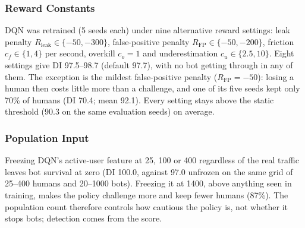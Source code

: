 \documentclass{ieeetj}
\begin{document}
\vspace{-15pt}
\subsubsection{Reward Constants}
DQN was retrained (5 seeds each) under nine alternative reward settings: leak penalty $R_{\text{leak}}\in\{-50,-300\}$, false-positive penalty $R_{\text{FP}}\in\{-50,-200\}$, friction $c_f\in\{1,4\}$ per second, overkill $c_o=1$ and underestimation $c_u\in\{2.5,10\}$. Eight settings give DI 97.5--98.7 (default 97.7), with no bot getting through in any of them. The exception is the mildest false-positive penalty ($R_{\text{FP}}=-50$): losing a human then costs little more than a challenge, and one of its five seeds kept only 70\% of humans (DI 70.4; mean 92.1). Every setting stays above the static threshold (90.3 on the same evaluation seeds) on average.

\vspace{-15pt}
\subsubsection{Population Input}
Freezing DQN's active-user feature at 25, 100 or 400 regardless of the real traffic leaves bot survival at zero (DI 100.0, against 97.0 unfrozen on the same grid of 25--400 humans and 20--1000 bots). Freezing it at 1400, above anything seen in training, makes the policy challenge more and keep fewer humans (87\%). The population count therefore controls how cautious the policy is, not whether it stops bots; detection comes from the score.

\end{document}
